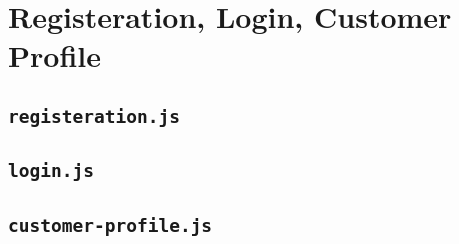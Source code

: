 \section{Registeration, Login, Customer Profile}

\subsection{\texttt{registeration.js}}
 

\subsection{\texttt{login.js}}
 

\subsection{\texttt{customer-profile.js}}
 